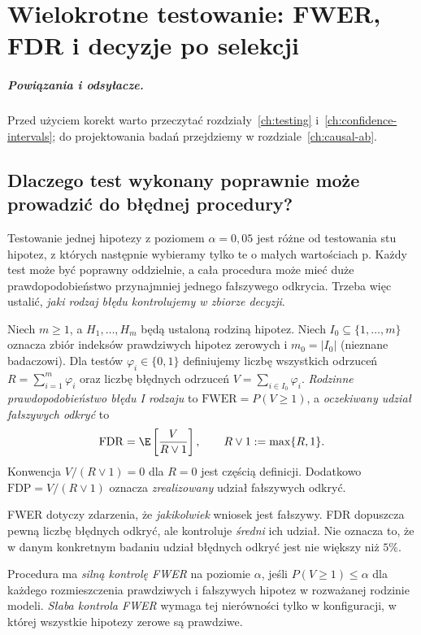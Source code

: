 \chapter{Wielokrotne testowanie: FWER, FDR i decyzje po selekcji}
\label{ch:multiple-testing}
\paragraph{Powiązania i odsyłacze.} Przed użyciem korekt warto przeczytać rozdziały~\ref{ch:testing} i~\ref{ch:confidence-intervals}; do projektowania badań przejdziemy w rozdziale~\ref{ch:causal-ab}.


\section{Dlaczego test wykonany poprawnie może prowadzić do błędnej procedury?}
Testowanie jednej hipotezy z poziomem $\alpha=0{,}05$ jest
różne od testowania stu hipotez, z których następnie
wybieramy tylko te o małych wartościach p. Każdy test
może być poprawny oddzielnie, a cała procedura może mieć
duże prawdopodobieństwo przynajmniej jednego
fałszywego odkrycia. Trzeba więc ustalić, \emph{jaki rodzaj
błędu kontrolujemy w zbiorze decyzji}.

\begin{definicja}\label{def:fwer-fdr}
Niech $m\ge1$, a $H_1,\ldots,H_m$ będą ustaloną rodziną
hipotez. Niech $I_0\subseteq\{1,\ldots,m\}$ oznacza
zbiór indeksów prawdziwych hipotez zerowych i
$m_0=|I_0|$ (nieznane badaczowi). Dla testów
$\varphi_i\in\{0,1\}$ definiujemy liczbę wszystkich
odrzuceń $R=\sum_{i=1}^m\varphi_i$ oraz liczbę
błędnych odrzuceń $V=\sum_{i\in I_0}\varphi_i$.
\emph{Rodzinne prawdopodobieństwo błędu I rodzaju} to
$\mathrm{FWER}=P(V\ge1)$, a \emph{oczekiwany udział
fałszywych odkryć} to
\[
 \mathrm{FDR}=\E\left[\frac{V}{R\vee1}\right],
 \qquad R\vee1:=\max\{R,1\}.
\]
Konwencja $V/(R\vee1)=0$ dla $R=0$ jest częścią definicji.
Dodatkowo $\mathrm{FDP}=V/(R\vee1)$ oznacza
\emph{zrealizowany} udział fałszywych odkryć.
\end{definicja}

FWER dotyczy zdarzenia, że \emph{jakikolwiek} wniosek
jest fałszywy. FDR dopuszcza pewną liczbę błędnych
odkryć, ale kontroluje \emph{średni} ich udział.
Nie oznacza to, że w danym konkretnym badaniu udział
błędnych odkryć jest nie większy niż $5\%$.

\begin{definicja}
Procedura ma \emph{silną kontrolę FWER} na poziomie
$\alpha$, jeśli $P(V\ge1)\le\alpha$ dla każdego
rozmieszczenia prawdziwych i fałszywych hipotez w rozważanej
rodzinie modeli. \emph{Słaba kontrola FWER} wymaga tej
nierówności tylko w konfiguracji, w której wszystkie
hipotezy zerowe są prawdziwe.
\end{definicja}

